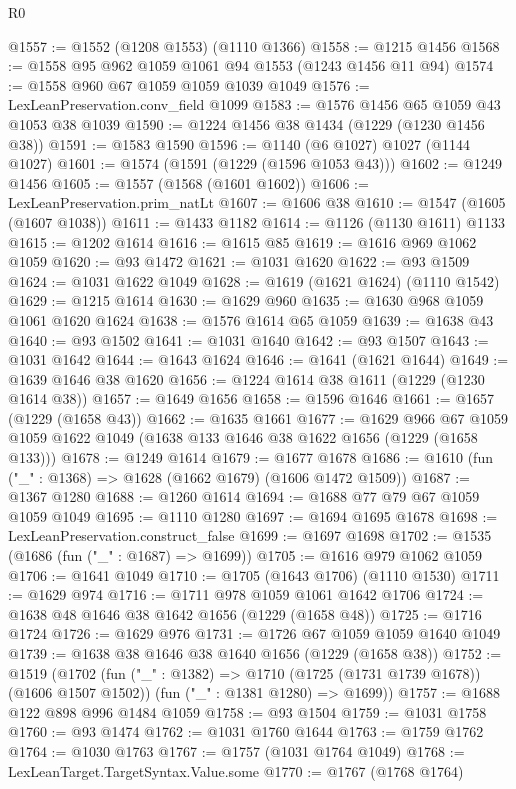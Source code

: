 \begin{lexlean}{R0}
\begin{coremodule}
@1557 := @1552 (@1208 @1553) (@1110 @1366)
@1558 := @1215 @1456
@1568 := @1558 @95 @962 @1059 @1061 @94 @1553 (@1243 @1456 @11 @94)
@1574 := @1558 @960 @67 @1059 @1059 @1039 @1049
@1576 := LexLeanPreservation.conv_field @1099
@1583 := @1576 @1456 @65 @1059 @43 @1053 @38 @1039
@1590 := @1224 @1456 @38 @1434 (@1229 (@1230 @1456 @38))
@1591 := @1583 @1590
@1596 := @1140 (@6 @1027) @1027 (@1144 @1027)
@1601 := @1574 (@1591 (@1229 (@1596 @1053 @43)))
@1602 := @1249 @1456
@1605 := @1557 (@1568 (@1601 @1602))
@1606 := LexLeanPreservation.prim_natLt
@1607 := @1606 @38
@1610 := @1547 (@1605 (@1607 @1038))
@1611 := @1433 @1182
@1614 := @1126 (@1130 @1611) @1133
@1615 := @1202 @1614
@1616 := @1615 @85
@1619 := @1616 @969 @1062 @1059
@1620 := @93 @1472
@1621 := @1031 @1620
@1622 := @93 @1509
@1624 := @1031 @1622 @1049
@1628 := @1619 (@1621 @1624) (@1110 @1542)
@1629 := @1215 @1614
@1630 := @1629 @960
@1635 := @1630 @968 @1059 @1061 @1620 @1624
@1638 := @1576 @1614 @65 @1059
@1639 := @1638 @43
@1640 := @93 @1502
@1641 := @1031 @1640
@1642 := @93 @1507
@1643 := @1031 @1642
@1644 := @1643 @1624
@1646 := @1641 (@1621 @1644)
@1649 := @1639 @1646 @38 @1620
@1656 := @1224 @1614 @38 @1611 (@1229 (@1230 @1614 @38))
@1657 := @1649 @1656
@1658 := @1596 @1646
@1661 := @1657 (@1229 (@1658 @43))
@1662 := @1635 @1661
@1677 := @1629
    @966
    @67
    @1059
    @1059
    @1622
    @1049
    (@1638 @133 @1646 @38 @1622 @1656 (@1229 (@1658 @133)))
@1678 := @1249 @1614
@1679 := @1677 @1678
@1686 := @1610 (fun ("_" : @1368) => @1628 (@1662 @1679) (@1606 @1472 @1509))
@1687 := @1367 @1280
@1688 := @1260 @1614
@1694 := @1688 @77 @79 @67 @1059 @1059 @1049
@1695 := @1110 @1280
@1697 := @1694 @1695 @1678
@1698 := LexLeanPreservation.construct_false
@1699 := @1697 @1698
@1702 := @1535 (@1686 (fun ("_" : @1687) => @1699))
@1705 := @1616 @979 @1062 @1059
@1706 := @1641 @1049
@1710 := @1705 (@1643 @1706) (@1110 @1530)
@1711 := @1629 @974
@1716 := @1711 @978 @1059 @1061 @1642 @1706
@1724 := @1638 @48 @1646 @38 @1642 @1656 (@1229 (@1658 @48))
@1725 := @1716 @1724
@1726 := @1629 @976
@1731 := @1726 @67 @1059 @1059 @1640 @1049
@1739 := @1638 @38 @1646 @38 @1640 @1656 (@1229 (@1658 @38))
@1752 := @1519
    (@1702
      (fun ("_" : @1382) => @1710 (@1725 (@1731 @1739 @1678)) (@1606 @1507 @1502))
      (fun ("_" : @1381 @1280) => @1699))
@1757 := @1688 @122 @898 @996 @1484 @1059
@1758 := @93 @1504
@1759 := @1031 @1758
@1760 := @93 @1474
@1762 := @1031 @1760 @1644
@1763 := @1759 @1762
@1764 := @1030 @1763
@1767 := @1757 (@1031 @1764 @1049)
@1768 := LexLeanTarget.TargetSyntax.Value.some
@1770 := @1767 (@1768 @1764)

\end{coremodule}
\end{lexlean}
